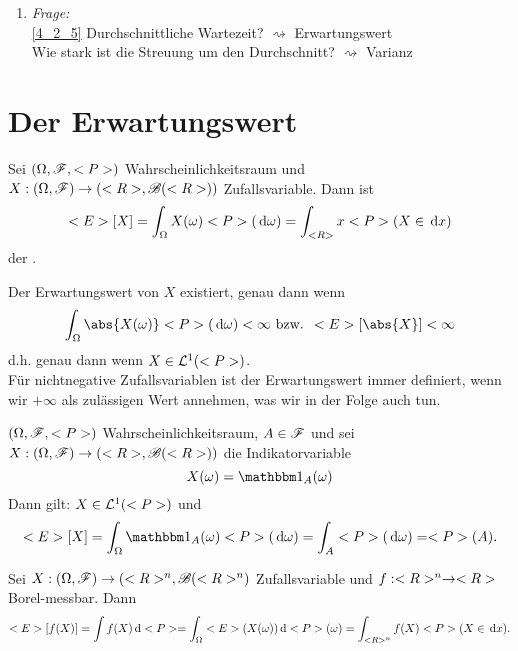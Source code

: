 \begin{enumerate}
	\item \emph{Frage:} \\
	\cref{4_2_5} Durchschnittliche Wartezeit? $\rightsquigarrow$ Erwartungswert\\
	Wie stark ist die Streuung um den Durchschnitt? $\rightsquigarrow$ Varianz
\end{enumerate}
\section{Der Erwartungswert}
\begin{definition}[Erwartungswert]
	Sei $(\Omega, \mathscr F, <P>)$ Wahrscheinlichkeitsraum und $X: (\Omega, \mathscr F) \to (<R>, \mathscr{B}(<R>))$ Zufallsvariable. Dann ist
	\begin{align*}
		<E>[X] = \int_{\Omega} X(\omega) <P>(\,\mathrm{d} \omega) = \int_{<R>} x <P>(X  \in \,\mathrm{d} x)
	\end{align*}
	der .
\end{definition}
\begin{*hint}
	Der Erwartungswert von $X$ existiert, genau dann wenn
	\begin{align*}
		\int_{\O} \abs{X(\omega)}\P(\d \omega) < \infty \bzw \E[\abs{X}] < \infty
	\end{align*}
	d.h. genau dann wenn $X \in \mathcal{L}^{1} (<P>)$.\\
	Für nichtnegative Zufallsvariablen ist der Erwartungswert immer definiert, wenn wir $+\infty$ als zulässigen Wert annehmen, was wir in der Folge auch tun.
\end{*hint}
\begin{example}
	$(\Omega, \mathscr F, <P>)$ Wahrscheinlichkeitsraum, $A \in \mathscr F$ und sei $X: (\Omega, \mathscr F) \to (<R>, \mathscr{B}(<R>))$ die Indikatorvariable %
	\[
		X(\omega) = \indi_{A} (\omega)
	\]
	Dann gilt: $X \in \mathcal{L}^{1}(<P>)$ und
	\begin{align*}
		\E[X] = \int_{\O} \indi_{A} (\omega) \P(\d \omega) = \int_{A} \P(\d \omega) = \P(A).
	\end{align*}
\end{example}
\begin{proposition}
	Sei $X: (\Omega, \mathscr F) \to (<R>^n, \mathscr{B}(<R>^n)$ Zufallsvariable und $f: <R>^n \to <R>$ Borel-messbar. Dann
	\begin{align*}
		<E>[f(X)] = \int f(X)\,\mathrm{d} <P> = \int_{\Omega} <E>(X(\omega)) \,\mathrm{d} <P>(\omega) = \int_{<R>^n} f(X) <P>(X \in \,\mathrm{d} x). 
	\end{align*}
\end{proposition}
